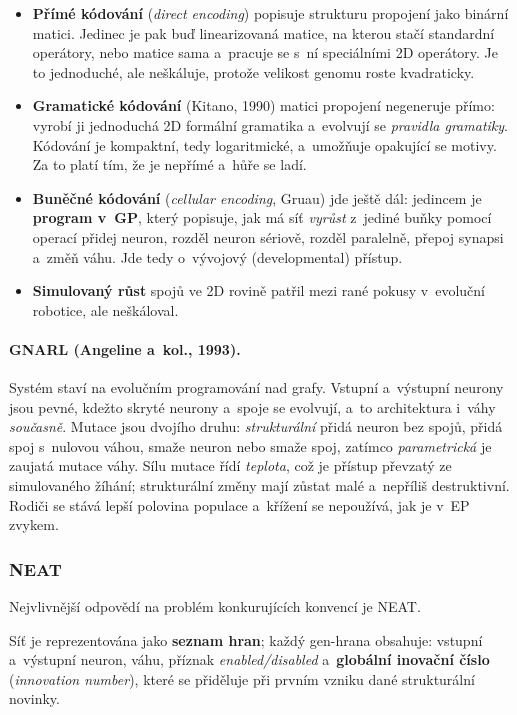 \documentclass[11pt,a4paper]{article}
\theoremstyle{definition}
\begin{document}
\begin{itemize}
\item \textbf{Přímé kódování} (\emph{direct encoding}) popisuje strukturu propojení jako
  binární matici. Jedinec je pak buď linearizovaná matice, na kterou stačí standardní
  operátory, nebo matice sama a~pracuje se s~ní speciálními 2D operátory. Je to jednoduché,
  ale neškáluje, protože velikost genomu roste kvadraticky.
\item \textbf{Gramatické kódování} (Kitano, 1990) matici propojení negeneruje přímo:
  vyrobí ji jednoduchá 2D formální gramatika a~evolvují se \emph{pravidla gramatiky}.
  Kódování je kompaktní, tedy logaritmické, a~umožňuje opakující se motivy. Za to platí tím,
  že je nepřímé a~hůře se ladí.
\item \textbf{Buněčné kódování} (\emph{cellular encoding}, Gruau) jde ještě dál: jedincem je
  \textbf{program v~GP}, který popisuje, jak má síť \emph{vyrůst} z~jediné buňky pomocí
  operací přidej neuron, rozděl neuron sériově, rozděl paralelně, přepoj synapsi a~změň
  váhu. Jde tedy o~vývojový (developmental) přístup.
\item \textbf{Simulovaný růst} spojů ve 2D rovině patřil mezi rané pokusy v~evoluční
  robotice, ale neškáloval.
\end{itemize}

\paragraph{GNARL (Angeline a~kol., 1993).} Systém staví na evolučním programování nad grafy.
Vstupní a~výstupní neurony jsou pevné, kdežto skryté neurony a~spoje se evolvují, a~to
architektura i~váhy \emph{současně}. Mutace jsou dvojího druhu: \emph{strukturální} přidá
neuron bez spojů, přidá spoj s~nulovou váhou, smaže neuron nebo smaže spoj, zatímco
\emph{parametrická} je zaujatá mutace váhy. Sílu mutace řídí \emph{teplota}, což je přístup
převzatý ze simulovaného žíhání; strukturální změny mají zůstat malé a~nepříliš destruktivní.
Rodiči se stává lepší polovina populace a~křížení se nepoužívá, jak je v~EP zvykem.

\subsubsection{NEAT}

Nejvlivnější odpovědí na problém konkurujících konvencí je NEAT.

\begin{defbox}
Síť je reprezentována jako \textbf{seznam hran}; každý gen-hrana obsahuje:
vstupní a~výstupní neuron, váhu, příznak \emph{enabled/disabled}
a~\textbf{globální inovační číslo} (\emph{innovation number}), které se
přiděluje při prvním vzniku dané strukturální novinky.
\end{defbox}
\end{document}
